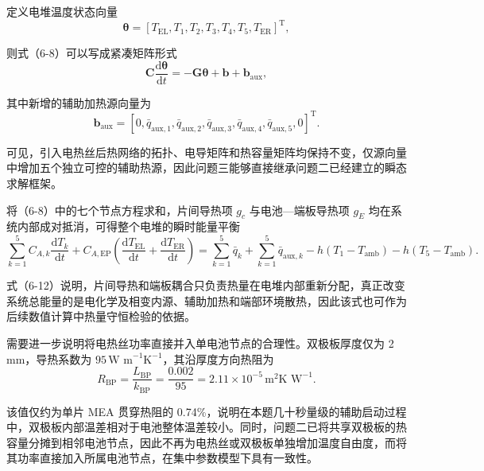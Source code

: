 \documentclass[bwprint]{gmcmthesis}
\numberwithin{figure}{section}
\begin{document}
\noindent 定义电堆温度状态向量
\begin{equation}
\boldsymbol{\theta} = [T_{\text{EL}}, T_1, T_2, T_3, T_4, T_5, T_{\text{ER}}]^{\text{T}}, \tag{6-9}
\end{equation}

\noindent 则式（6-8）可以写成紧凑矩阵形式
\begin{equation}
\mathbf{C} \frac{\text{d}\boldsymbol{\theta}}{\text{d}t} = -\mathbf{G}\boldsymbol{\theta} + \mathbf{b} + \mathbf{b}_{\text{aux}}, \tag{6-10}
\end{equation}

\noindent 其中新增的辅助加热源向量为
\begin{equation}
\mathbf{b}_{\text{aux}} = [0, \bar{q}_{\text{aux},1}, \bar{q}_{\text{aux},2}, \bar{q}_{\text{aux},3}, \bar{q}_{\text{aux},4}, \bar{q}_{\text{aux},5}, 0]^{\text{T}}. \tag{6-11}
\end{equation}

\noindent 可见，引入电热丝后热网络的拓扑、电导矩阵和热容量矩阵均保持不变，仅源向量中增加五个独立可控的辅助热源，因此问题三能够直接继承问题二已经建立的瞬态求解框架。


\noindent 将（6-8）中的七个节点方程求和，片间导热项 \(g_c\) 与电池—端板导热项 \(g_E\) 均在系统内部成对抵消，可得整个电堆的瞬时能量平衡
\begin{equation}
\sum_{k=1}^5 C_{A,k} \frac{\text{d}T_k}{\text{d}t} + C_{A,\text{EP}} \left( \frac{\text{d}T_{\text{EL}}}{\text{d}t} + \frac{\text{d}T_{\text{ER}}}{\text{d}t} \right) = \sum_{k=1}^5 \bar{q}_k + \sum_{k=1}^5 \bar{q}_{\text{aux},k} - h(T_1 - T_{\text{amb}}) - h(T_5 - T_{\text{amb}}). \tag{6-12}
\end{equation}

\noindent 式（6-12）说明，片间导热和端板耦合只负责热量在电堆内部重新分配，真正改变系统总能量的是电化学及相变内源、辅助加热和端部环境散热，因此该式也可作为后续数值计算中热量守恒检验的依据。

\noindent 需要进一步说明将电热丝功率直接并入单电池节点的合理性。双极板厚度仅为 2 mm，导热系数为 \(95 \, \text{W m}^{-1}\text{K}^{-1}\)，其沿厚度方向热阻为
\begin{equation}
R_{\text{BP}} = \frac{L_{\text{BP}}}{k_{\text{BP}}} = \frac{0.002}{95} = 2.11 \times 10^{-5} \, \text{m}^2\text{K W}^{-1}. \tag{6-13}
\end{equation}

\noindent 该值仅约为单片 MEA 贯穿热阻的 0.74\%，说明在本题几十秒量级的辅助启动过程中，双极板内部温差相对于电池整体温差较小。同时，问题二已将共享双极板的热容量分摊到相邻电池节点，因此不再为电热丝或双极板单独增加温度自由度，而将其功率直接加入所属电池节点，在集中参数模型下具有一致性。
\end{document}
